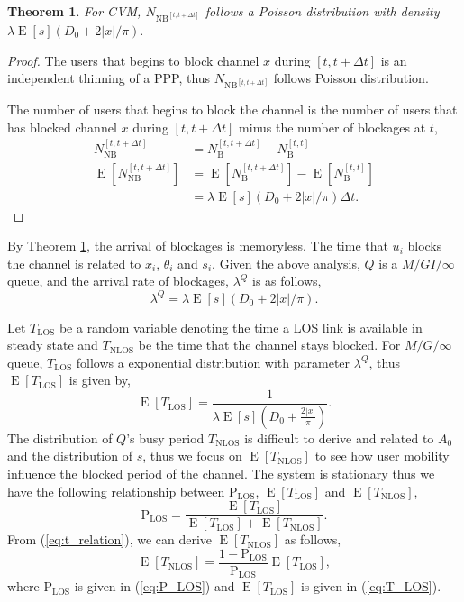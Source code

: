 \documentclass[10pt, conference, letterpaper]{IEEEtran}
\newtheorem{theorem}{Theorem}
\DeclareMathOperator*{\E}{\mathrm{E}}
\DeclareMathOperator*{\LOS}{\mathrm{LOS}}
\DeclareMathOperator*{\NLOS}{\mathrm{NLOS}}
\begin{document}
\begin{theorem}\label{theorem:poisson_arrival}
For CVM, $N_{\mathrm{NB}^{[t, t+\Delta t]}}$ follows a Poisson distribution with density $\lambda\E[s](D_0 + 2|x|/\pi).$
\end{theorem}
\begin{proof}
The users that begins to block channel $x$ during $[t, t+\Delta t]$ is an independent thinning of a PPP, thus $N_{\mathrm{NB}^{[t, t+\Delta t]}}$ follows Poisson distribution. 

The number of users that begins to block the channel is the number of users that has blocked channel $x$ during $[t, t+\Delta t]$ minus the number of blockages at $t$,  
\begin{equation*}
\begin{aligned}
N_{\mathrm{NB}}^{[t, t+\Delta t]} & = N_\mathrm{B}^{[t, t+\Delta t]} - N_\mathrm{B}^{[t, t]} \\
\E[N_{\mathrm{NB}}^{[t, t+\Delta t]}] & = \E[N_\mathrm{B}^{[t, t+\Delta t]}] - \E[N_\mathrm{B}^{[t, t]}] \\
									  & = \lambda\E[s](D_0 + 2|x|/\pi)\Delta t.
\end{aligned}
\end{equation*}
\end{proof}

By Theorem \ref{theorem:poisson_arrival}, the arrival of blockages is memoryless. The time that $u_i$ blocks the channel is related to $x_i$, $\theta_i$ and $s_i$. Given the above analysis, $Q$ is a $M/GI/\infty$ queue,  and the arrival rate of blockages, $\lambda^Q$ is as follows,
\begin{equation}\label{eq:lambda_queue}
\lambda^Q = \lambda\E[s](D_0 + 2|x|/\pi).
\end{equation} 

Let $T_{\mathrm{LOS}}$ be a random variable denoting the time a LOS link is available in steady state and $T_{\mathrm{NLOS}}$ be the time that the channel stays blocked. For $M/G/\infty$ queue, $T_{\mathrm{LOS}}$ follows a exponential distribution with parameter $\lambda^Q$, thus $\E[T_{\mathrm{LOS}}]$ is given by, 
\begin{equation}\label{eq:T_LOS}
\E[T_{\mathrm{LOS}}] = \frac{1}{\lambda\E[s](D_0 + \frac{2|x|}{\pi})}.
\end{equation}
The distribution of $Q$'s busy period $T_{\NLOS}$ is difficult to derive and related to $A_0$ and the distribution of $s$, thus we focus on $\E[T_{\mathrm{NLOS}}]$ to see how user mobility influence the blocked period of the channel. The system is stationary thus we have the following relationship between $\mathrm{P}_{\LOS}$, $\E[T_{\LOS}]$ and $\E[T_{\NLOS}]$, 
\begin{equation}\label{eq:t_relation}
\mathrm{P}_{\LOS} = \frac{\E[T_{\LOS}]}{\E[T_{\LOS}] + \E[T_{\NLOS}]}.
\end{equation}
From (\ref{eq:t_relation}), we can derive $\E[T_{\NLOS}]$ as follows, 
\begin{equation*}\label{eq:T_NLOS}
\E[T_{\NLOS}] = \frac{1-\mathrm{P}_{\LOS}}{\mathrm{P}_{\LOS}}\E[T_{\LOS}],
\end{equation*}
where $\mathrm{P}_{\LOS}$ is given in (\ref{eq:P_LOS}) and $\E[T_{\LOS}]$ is given in (\ref{eq:T_LOS}).
\end{document}
